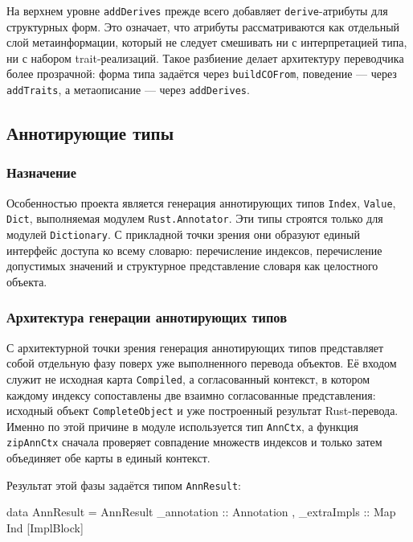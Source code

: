 \documentclass[a4paper,12pt]{article}
\begin{document}
На верхнем уровне \texttt{addDerives} прежде всего добавляет \texttt{derive}-атрибуты
для структурных форм. Это означает, что атрибуты рассматриваются как отдельный слой
метаинформации, который не следует смешивать ни с интерпретацией типа, ни с набором
trait-реализаций. Такое разбиение делает архитектуру переводчика более прозрачной:
форма типа задаётся через \texttt{buildCOFrom}, поведение --- через \texttt{addTraits},
а метаописание --- через \texttt{addDerives}.

\subsection{Аннотирующие типы}

\subsubsection{Назначение}

Особенностью проекта является генерация аннотирующих типов \texttt{Index},
\texttt{Value}, \texttt{Dict}, выполняемая модулем \texttt{Rust.Annotator}. Эти типы
строятся только для модулей \texttt{Dictionary}. С прикладной точки зрения они
образуют единый интерфейс доступа ко всему словарю: перечисление индексов,
перечисление допустимых значений и структурное представление словаря как целостного
объекта.

\subsubsection{Архитектура генерации аннотирующих типов}

С архитектурной точки зрения генерация аннотирующих типов представляет собой отдельную
фазу поверх уже выполненного перевода объектов. Её входом служит не исходная карта
\texttt{Compiled}, а согласованный контекст, в котором каждому индексу сопоставлены две
взаимно согласованные представления: исходный объект \texttt{CompleteObject} и уже построенный
результат Rust-перевода. Именно по этой причине в модуле используется тип
\texttt{AnnCtx}, а функция \texttt{zipAnnCtx} сначала проверяет совпадение множеств
индексов и только затем объединяет обе карты в единый контекст.

Результат этой фазы задаётся типом \texttt{AnnResult}:

\begin{flushleft}
\label{lst:ann-result}
\begin{MyCodes}
data AnnResult = AnnResult
  { _annotation :: Annotation
  , _extraImpls :: Map Ind [ImplBlock]
  }
\end{MyCodes}
\end{flushleft}
\end{document}
